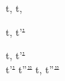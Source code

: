 








  { }
  {t,\Sigma {} t,\Sigma}





  {t,\Sigma {} t'\st{'}}


  {t,\Sigma   {} t'\st{'} \\
   t'\st{'} \normalise t''\st{''}}
  {t,\Sigma {} t''\st{''}}
